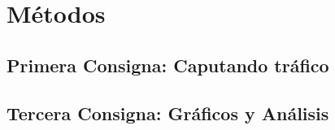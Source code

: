 \section{M\'etodos}

\subsection{Primera Consigna: Caputando tr\'afico}\label{sec:metodos_1}

\subsection{Tercera Consigna: Gr\'aficos y An\'alisis}

